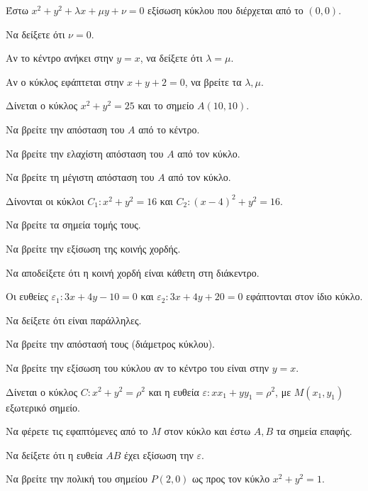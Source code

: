 \documentclass[11pt,a4paper,modern]{FFExercises}
\begin{document}
\askhsh
Έστω $x^2 + y^2 + \lambda x + \mu y + \nu = 0$ εξίσωση κύκλου που διέρχεται από το $(0,0)$.
\begin{alist}
    \item Να δείξετε ότι $\nu = 0$.
    \item Αν το κέντρο ανήκει στην $y=x$, να δείξετε ότι $\lambda = \mu$.
    \item Αν ο κύκλος εφάπτεται στην $x+y+2=0$, να βρείτε τα $\lambda, \mu$.
\end{alist}

\askhsh
Δίνεται ο κύκλος $x^2 + y^2 = 25$ και το σημείο $A(10,10)$.
\begin{alist}
    \item Να βρείτε την απόσταση του $A$ από το κέντρο.
    \item Να βρείτε την ελαχίστη απόσταση του $A$ από τον κύκλο.
    \item Να βρείτε τη μέγιστη απόσταση του $A$ από τον κύκλο.
\end{alist}

\askhsh
Δίνονται οι κύκλοι $C_1: x^2+y^2=16$ και $C_2: (x-4)^2+y^2=16$.
\begin{alist}
    \item Να βρείτε τα σημεία τομής τους.
    \item Να βρείτε την εξίσωση της κοινής χορδής.
    \item Να αποδείξετε ότι η κοινή χορδή είναι κάθετη στη διάκεντρο.
\end{alist}

\askhsh
Οι ευθείες $\varepsilon_1: 3x + 4y - 10 = 0$ και $\varepsilon_2: 3x + 4y + 20 = 0$ εφάπτονται στον ίδιο κύκλο.
\begin{alist}
    \item Να δείξετε ότι είναι παράλληλες.
    \item Να βρείτε την απόστασή τους (διάμετρος κύκλου).
    \item Να βρείτε την εξίσωση του κύκλου αν το κέντρο του είναι στην $y=x$.
\end{alist}

\askhsh
Δίνεται ο κύκλος $C: x^2 + y^2 = \rho^2$ και η ευθεία $\varepsilon: x x_1 + y y_1 = \rho^2$, με $M(x_1, y_1)$ εξωτερικό σημείο.
\begin{alist}
    \item Να φέρετε τις εφαπτόμενες από το $M$ στον κύκλο και έστω $A, B$ τα σημεία επαφής.
    \item Να δείξετε ότι η ευθεία $AB$ έχει εξίσωση την $\varepsilon$.
    \item Να βρείτε την πολική του σημείου $P(2,0)$ ως προς τον κύκλο $x^2+y^2=1$.
\end{alist}
\end{document}
